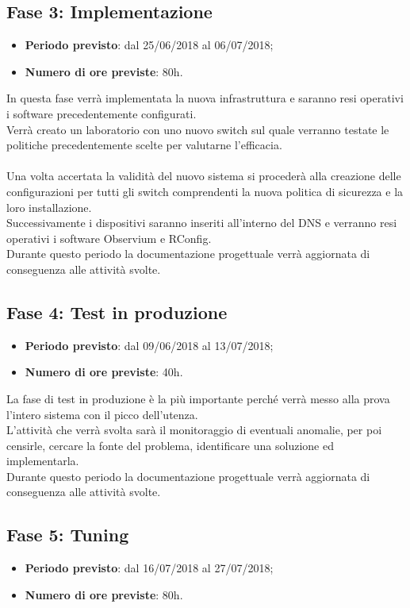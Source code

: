 \documentclass[Tesi.tex]{subfiles}
\begin{document}
\subsection{Fase 3: Implementazione}
\begin{itemize}
	\item \textbf{Periodo previsto}: dal 25/06/2018 al 06/07/2018;
	\item \textbf{Numero di ore previste}: 80h.
\end{itemize}
	
In questa fase verrà implementata la nuova infrastruttura e saranno resi operativi i software precedentemente configurati. \\
Verrà creato un laboratorio con uno nuovo switch sul quale verranno testate le politiche precedentemente scelte per valutarne l'efficacia.\\\\
Una volta accertata la validità del nuovo sistema si procederà alla creazione delle configurazioni per tutti gli switch comprendenti la nuova politica di sicurezza e la loro installazione. \\
Successivamente i dispositivi saranno inseriti all'interno del DNS e verranno resi operativi i software Observium e RConfig. \\
Durante questo periodo la documentazione progettuale verrà aggiornata di conseguenza alle attività svolte.


\subsection{Fase 4: Test in produzione}
\begin{itemize}
	\item \textbf{Periodo previsto}: dal 09/06/2018 al 13/07/2018;
	\item \textbf{Numero di ore previste}: 40h.
\end{itemize}
	
La fase di test in produzione è la più importante perché verrà messo alla prova l'intero sistema con il picco dell'utenza. \\
L'attività che verrà svolta sarà il monitoraggio di eventuali anomalie, per poi censirle, cercare la fonte del problema, identificare una soluzione ed implementarla. \\
Durante questo periodo la documentazione progettuale verrà aggiornata di conseguenza alle attività svolte.

	

\subsection{Fase 5: Tuning}
\begin{itemize}
	\item \textbf{Periodo previsto}: dal 16/07/2018 al 27/07/2018;
	\item \textbf{Numero di ore previste}: 80h.
\end{itemize}
	
\end{document}

